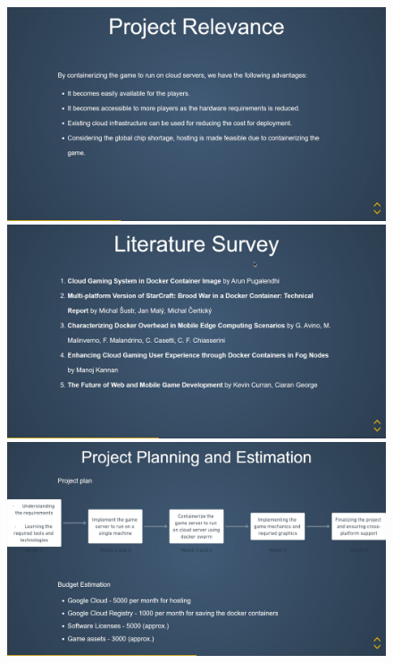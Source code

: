 \documentclass[oneside,12pt]{Classes/VTU}
\begin{document}
	\pagebreak
	\begin{figure}[ht!]
		\centering
		\includegraphics[scale=0.22]{s4.jpg}\vfill
		\includegraphics[scale=0.22]{s5.jpg}\vfill
		\includegraphics[scale=0.22]{s6.jpg}\vfill
	\end{figure}
\end{document}
